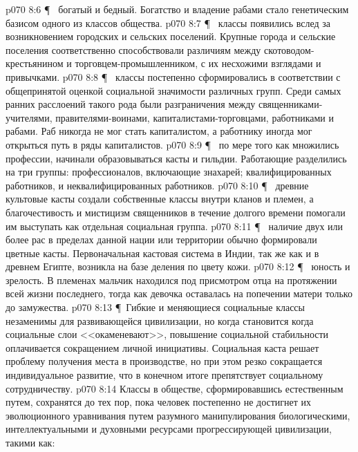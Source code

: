\vs p070 8:6 \P\ \bibnobreakspace {} богатый и бедный. Богатство и владение рабами стало генетическим базисом одного из классов общества.
\vs p070 8:7 \P\ \bibnobreakspace {} классы появились вслед за возникновением городских и сельских поселений. Крупные города и сельские поселения соответственно способствовали различиям между скотоводом\hyp{}крестьянином и торговцем\hyp{}промышленником, с их несхожими взглядами и привычками.
\vs p070 8:8 \P\ \bibnobreakspace {} классы постепенно сформировались в соответствии с общепринятой оценкой социальной значимости различных групп. Среди самых ранних расслоений такого рода были разграничения между священниками\hyp{}учителями, правителями\hyp{}воинами, капиталистами\hyp{}торговцами, работниками и рабами. Раб никогда не мог стать капиталистом, а работнику иногда мог открыться путь в ряды капиталистов.
\vs p070 8:9 \P\ \bibnobreakspace {} по мере того как множились профессии, начинали образовываться касты и гильдии. Работающие разделились на три группы: профессионалов, включающие знахарей; квалифицированных работников, и неквалифицированных работников.
\vs p070 8:10 \P\ \bibnobreakspace {} древние культовые касты создали собственные классы внутри кланов и племен, а благочестивость и мистицизм священников в течение долгого времени помогали им выступать как отдельная социальная группа.
\vs p070 8:11 \P\ \bibnobreakspace {} наличие двух или более рас в пределах данной нации или территории обычно формировали цветные касты. Первоначальная кастовая система в Индии, так же как и в древнем Египте, возникла на базе деления по цвету кожи.
\vs p070 8:12 \P\ \bibnobreakspace {} юность и зрелость. В племенах мальчик находился под присмотром отца на протяжении всей жизни последнего, тогда как девочка оставалась на попечении матери только до замужества.
\vs p070 8:13 \P\ Гибкие и меняющиеся социальные классы незаменимы для развивающейся цивилизации, но когда  становится  когда социальные слои <<окаменевают>>, повышение социальной стабильности оплачивается сокращением личной инициативы. Социальная каста решает проблему получения места в производстве, но при этом резко сокращается индивидуальное развитие, что в конечном итоге препятствует социальному сотрудничеству.
\vs p070 8:14 Классы в обществе, сформировавшись естественным путем, сохранятся до тех пор, пока человек постепенно не достигнет их эволюционного уравнивания путем разумного манипулирования биологическими, интеллектуальными и духовными ресурсами прогрессирующей цивилизации, такими как:
